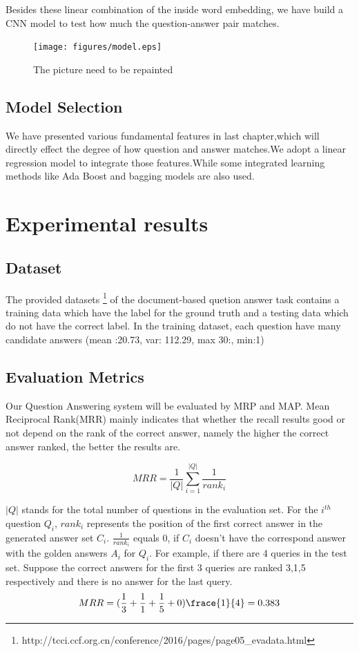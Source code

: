 \documentclass{llncs}
\begin{document}
Besides these linear combination of the inside word embedding, we have build a CNN model to test how much the question-answer pair matches. 
\begin{figure}
\centering
\texttt{[image: figures/model.eps]}
\caption{ The picture need to be repainted}
\label{fig:model}
\end{figure}



\subsection{Model Selection}
\label{sec:model}

We have presented various fundamental features in last chapter,which will directly effect the degree of how question and answer matches.We adopt a linear regression model to integrate those features.While some integrated learning methods like Ada Boost and bagging models are also used. 


\section{Experimental results}


\subsection{Dataset}

The provided datasets \footnote{ http://tcci.ccf.org.cn/conference/2016/pages/page05\_evadata.html} of the document-based quetion answer task contains a training data which have the label for the ground truth and a testing data which do not have the correct label.  In the training dataset, each question have many candidate answers (mean :20.73, var: 112.29, max 30:, min:1) 


\subsection{Evaluation Metrics}
Our Question Answering system will be evaluated by MRP and MAP. Mean Reciprocal Rank(MRR) mainly indicates that whether the recall results good or not depend on the rank of the correct answer, namely the higher the correct answer ranked, the better the results are. 

\begin{equation}
MRR=\frac{1}{|Q|}\sum_{i=1}^|Q|\frac{1}{rank_{i}}
\end{equation}

$|Q|$ stands for the total number of questions in the evaluation set. For the \(i^{th}\) question \(Q_{i}\), \(rank_{i}\) represents the position of the first correct answer in the generated answer set \(C_{i}\). \(\frac{1}{rank_{i}}\) equals 0, if \(C_{i}\) doesn't have the correspond answer with the golden answers \(A_{i}\) for \(Q_{i}\). For example, if there are 4 queries in the test set. Suppose the correct answers for the first 3 queries are ranked 3,1,5 respectively and there is no answer for the last query. 
$$MRR=(\frac{1}{3}+\frac{1}{1}+\frac{1}{5}+0)\frace{1}{4}=0.383$$
\end{document}

